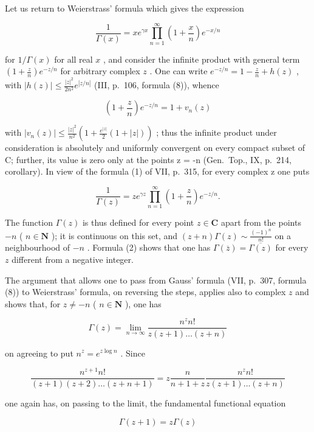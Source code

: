 Let us return to Weierstrass' formula which gives the expression

\[
\frac {1}{\Gamma (x)} = x e ^ {\gamma x} \prod_ {n = 1} ^ {\infty} \left(1 + \frac {x}{n}\right) e ^ {- x / n}\tag{1}
\]

for \(1 / \Gamma (x)\) for all real \(x\) , and consider the infinite product with general term \(\left(1 + \frac{z}{n}\right)e^{-z / n}\) for arbitrary complex \(z\) . One can write \(e^{-z / n} = 1 - \frac{z}{n} + h(z)\) , with \(|h(z)| \leqslant \frac{|z|^2}{2n^2} e^{|z / n|}\) (III, p.~106, formula (8)), whence

\[
\left(1 + \frac {z}{n}\right) e ^ {- z / n} = 1 + v _ {n} (z)
\]

with \(|v_{n}(z)| \leqslant \frac{|z|^{2}}{n^{2}}\left(1 + \frac{e^{|z|}}{2}(1 + |z|)\right)\) ; thus the infinite product under consideration is absolutely and uniformly convergent on every compact subset of C; further, its value is zero only at the points z = -n (Gen.~Top., IX, p.~214, corollary). In view of the formula (1) of VII, p.~315, for every complex z one puts

\[
\frac {1}{\Gamma (z)} = z e ^ {\gamma z} \prod_ {n = 1} ^ {\infty} \left(1 + \frac {z}{n}\right) e ^ {- z / n}.\tag{2}
\]

The function \(\Gamma(z)\) is thus defined for every point \(z \in \mathbf{C}\) apart from the points \(-n\) ( \(n \in \mathbf{N}\) ); it is continuous on this set, and \((z + n)\Gamma(z) \sim \frac{(-1)^n}{n!}\) on a neighbourhood of \(-n\) . Formula (2) shows that one has \(\Gamma(\overline{z}) = \overline{\Gamma(z)}\) for every \(z\) different from a negative integer.

The argument that allows one to pass from Gauss' formula (VII, p.~307, formula (8)) to Weierstrass' formula, on reversing the steps, applies also to complex \(z\) and shows that, for \(z \neq -n\) ( \(n \in \mathbf{N}\) ), one has

\[
\Gamma (z) = \lim _ {n \rightarrow \infty} \frac {n ^ {z} n !}{z (z + 1) \dots (z + n)}\tag{3}
\]

on agreeing to put \(n^z = e^{z\log n}\) . Since

\[
\frac {n ^ {z + 1} n !}{(z + 1) (z + 2) \dots (z + n + 1)} = z \frac {n}{n + 1 + z} \frac {n ^ {z} n !}{z (z + 1) \dots (z + n)}
\]

one again has, on passing to the limit, the fundamental functional equation

\[
\Gamma (z + 1) = z \Gamma (z)\tag{4}
\]

